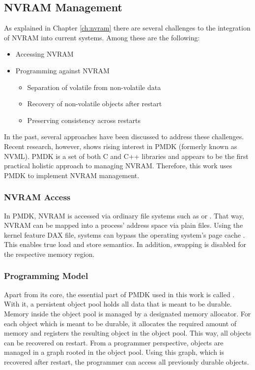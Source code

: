 \subsection{NVRAM Management}
\label{ch:impl-nvram}

As explained in Chapter \ref{ch:nvram} there are several challenges to the
integration of NVRAM into current systems. Among these are the following:

\begin{itemize}
    \item Accessing NVRAM
    \item Programming against NVRAM
    \begin{itemize}
        \item Separation of volatile from non-volatile data
        \item Recovery of non-volatile objects after restart
        \item Preserving consistency across restarts
    \end{itemize}
\end{itemize}

In the past, several approaches have been discussed to address these challenges.
Recent research, however, shows rising interest in PMDK (formerly known as
NVML). PMDK is a set of both C and C++ libraries and appears to be the first
practical holistic approach to managing NVRAM. Therefore, this work uses PMDK to
implement NVRAM management.

\subsubsection{NVRAM Access}

In PMDK, NVRAM is accessed via ordinary file systems such as  or
. That way, NVRAM can be mapped into a process' address space via
plain files. Using the kernel feature \ac{DAX} file,
systems can bypass the operating system's page cache \cite{oukid2017data,
andrei2017sap, rudoff2017persistent}. This enables true load and store
semantics. In addition, swapping is disabled for the respective memory region.

\subsubsection{Programming Model}

Apart from its core, the essential part of PMDK used in this work is called
. With it, a persistent object pool holds all data that is meant
to be durable. Memory inside the object pool is managed by a designated memory
allocator. For each object which is meant to be durable, it allocates the
required amount of memory and registers the resulting object in the object pool.
This way, all objects can be recovered on restart. From a programmer
perspective, objects are managed in a graph rooted in the object pool. Using
this graph, which is recovered after restart, the programmer can access all
previously durable objects.

